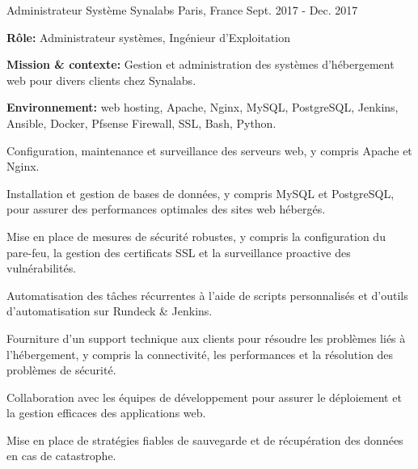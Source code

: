 \begin{cventries}
{\begin{cvitems}
{%
\cventry
{Administrateur Système} %
{Synalabs} %
{Paris, France} %
{Sept. 2017 - Dec. 2017} %
{
  \begin{cvitems} %
    \item {\textbf{Rôle:} Administrateur systèmes, Ingénieur d'Exploitation}
    \item {\textbf{Mission \& contexte:} Gestion et administration des systèmes d'hébergement web pour divers clients chez Synalabs.}
    \item {\textbf{Environnement:} web hosting, Apache, Nginx, MySQL, PostgreSQL, Jenkins, Ansible, Docker, Pfsense Firewall, SSL, Bash, Python.} 
    \item {Configuration, maintenance et surveillance des serveurs web, y compris Apache et Nginx.}
    \item {Installation et gestion de bases de données, y compris MySQL et PostgreSQL, pour assurer des performances optimales des sites web hébergés.}
    \item {Mise en place de mesures de sécurité robustes, y compris la configuration du pare-feu, la gestion des certificats SSL et la surveillance proactive des vulnérabilités.}
    \item {Automatisation des tâches récurrentes à l'aide de scripts personnalisés et d'outils d'automatisation sur Rundeck \& Jenkins.}
    \item {Fourniture d'un support technique aux clients pour résoudre les problèmes liés à l'hébergement, y compris la connectivité, les performances et la résolution des problèmes de sécurité.}
    \item {Collaboration avec les équipes de développement pour assurer le déploiement et la gestion efficaces des applications web.}
    \item {Mise en place de stratégies fiables de sauvegarde et de récupération des données en cas de catastrophe.}
  \end{cvitems}
}

}
\end{cvitems}}
\end{cventries}
